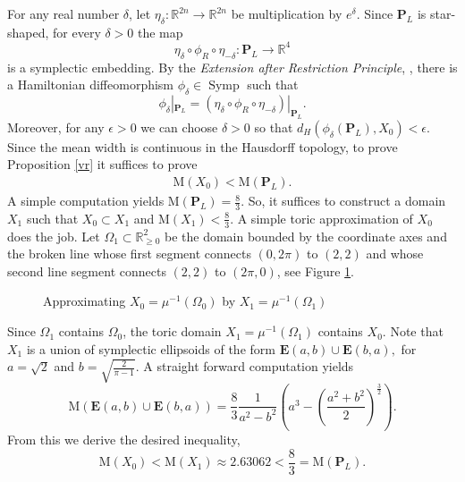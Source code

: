 \documentclass[12pt]{amsart}
\theoremstyle{definition}
\newcommand\Symp{\operatorname{Symp}}
\newcommand{\RR}{{\mathbb R}}
\newcommand{\mw}{{{\mathrm {M}}}}
\begin{document}
For any real number $\delta$, let $\eta_{\delta} \colon \RR^{2n} \to \RR^{2n}$ be multiplication by $e^{\delta}$. Since $\mathbf{P}_L$ is star-shaped, for every $\delta>0$ the map 
$$\eta_{\delta}\circ \phi_R \circ \eta_{-\delta} \colon \mathbf{P}_L \to \RR^{4}$$ is a symplectic embedding. By the {\em Extension after Restriction Principle}, \cite{schl}, there is a Hamiltonian diffeomorphism $\phi_{\delta} \in \Symp$ such that $$ \phi_{\delta}|_{\mathbf{P}_L} =(\eta_{\delta}\circ \phi_R \circ \eta_{-\delta}) |_{\mathbf{P}_L}.$$
Moreover, for any $\epsilon>0$ we can choose $\delta >0$ so that $d_H(\phi_{\delta}(\mathbf{P}_L), X_0) < \epsilon.$ Since the mean width is continuous in the Hausdorff topology, to prove Proposition \ref{vr} it suffices to prove
\begin{align*}
    \mw(X_0) < \mw(\mathbf{P}_L).
\end{align*}
A simple computation yields $\mw(\mathbf{P}_L) = \frac{8}{3}$. So, it suffices to construct a domain $X_1$ such that $X_0 \subset X_1$ and $\mw(X_1) < \frac{8}{3}.$ A simple toric approximation of $X_0$ does the job. Let $\Omega_1 \subset \RR^2_{\geq 0}$ be the domain bounded by the coordinate axes and the broken line whose first segment connects $(0,2\pi)$ to $(2,2)$ and whose second line segment connects $(2,2)$ to $(2\pi,0)$, see Figure \ref{fig:O1}.
\begin{figure}
    \centering
    \caption{Approximating $X_0 =\mu^{-1}(\Omega_0)$ by $X_1 =\mu^{-1}(\Omega_1)$}
    \label{fig:O1}
        \vspace{.5cm}
\end{figure}
Since $\Omega_1$ contains $\Omega_0$, the toric domain $X_1 = \mu^{-1}(\Omega_1)$ contains $X_0$. Note that $X_1$ is a union of symplectic ellipsoids of the form $\mathbf{E}(a,b) \cup \mathbf{E}(b,a),$ for $a=\sqrt{2}$ and $b=\sqrt{\frac{2}{\pi-1}}.$ A straight forward computation yields $$\mw(\mathbf{E}(a,b) \cup \mathbf{E}(b,a)) = \frac{8}{3}\frac{1}{a^2-b^2}\left(a^3 -\left(\frac{a^2+b^2}{2}\right)^{\frac{3}{2}}\right).$$
From this we derive the desired inequality,  $$\mw(X_0)< \mw(X_1) \approx 2.63062 < \frac{8}{3}=\mw(\mathbf{P}_L).$$
\end{document}
